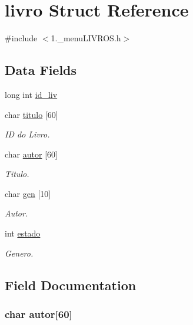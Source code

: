 \hypertarget{structlivro}{\section{livro Struct Reference}
\label{structlivro}
}


{\ttfamily \#include $<$1.\+\_\+menu\+L\+I\+V\+R\+O\+S.\+h$>$}

\subsection*{Data Fields}
\begin{DoxyCompactItemize}
\item 
long int \hyperlink{structlivro_a06dd325b1ebe2325328d3d76fae3823a}{id\+\_\+liv}
\item 
char \hyperlink{structlivro_adff70562cca95767369bccf3714e22e9}{titulo} \mbox{[}60\mbox{]}
\begin{DoxyCompactList}\small\item\em I\+D do Livro. \end{DoxyCompactList}\item 
char \hyperlink{structlivro_add9eee69a1a2bf18ad97aa2d57961845}{autor} \mbox{[}60\mbox{]}
\begin{DoxyCompactList}\small\item\em Titulo. \end{DoxyCompactList}\item 
char \hyperlink{structlivro_a81b3cc6450c77481974037c3222cb9ff}{gen} \mbox{[}10\mbox{]}
\begin{DoxyCompactList}\small\item\em Autor. \end{DoxyCompactList}\item 
int \hyperlink{structlivro_a876d08c1d21086e4fd228744da10d028}{estado}
\begin{DoxyCompactList}\small\item\em Genero. \end{DoxyCompactList}\end{DoxyCompactItemize}


\subsection{Field Documentation}
\hypertarget{structlivro_add9eee69a1a2bf18ad97aa2d57961845}{
\subsubsection[{autor}]{\setlength{\rightskip}{0pt plus 5cm}char autor\mbox{[}60\mbox{]}}}\label{structlivro_add9eee69a1a2bf18ad97aa2d57961845}


